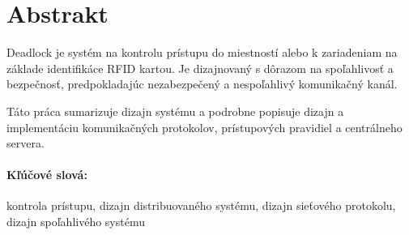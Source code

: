 
\newpage
\section*{Abstrakt}

Deadlock je systém na kontrolu prístupu do miestností alebo k zariadeniam na základe identifikáce RFID kartou. Je dizajnovaný s dôrazom na spoľahlivosť a bezpečnosť, predpokladajúc nezabezpečený a nespoľahlivý komunikačný kanál.

Táto práca sumarizuje dizajn systému a podrobne popisuje dizajn a implementáciu komunikačných protokolov, prístupových pravidiel a centrálneho servera.

\paragraph*{Kľúčové slová:} kontrola prístupu, dizajn distribuovaného systému, dizajn sieťového protokolu, dizajn spoľahlivého systému


%
%



\newpage

\tableofcontents






\mainmatter
